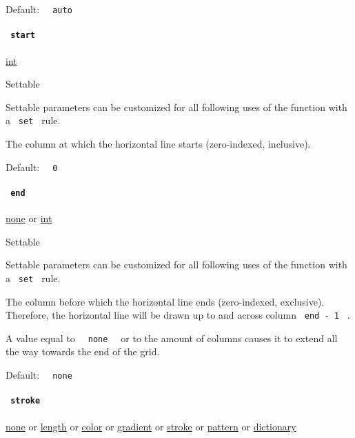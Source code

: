 Default: \texttt{\ }{\texttt{\ auto\ }}\texttt{\ }

\paragraph{\texorpdfstring{\texttt{\ start\ }}{ start }}\label{definitions-hline-start}

\href{/docs/reference/foundations/int/}{int}

{{ Settable }}

\label{definitions-hline-start-settable-tooltip}
Settable parameters can be customized for all following uses of the
function with a \texttt{\ set\ } rule.

The column at which the horizontal line starts (zero-indexed,
inclusive).

Default: \texttt{\ }{\texttt{\ 0\ }}\texttt{\ }

\paragraph{\texorpdfstring{\texttt{\ end\ }}{ end }}\label{definitions-hline-end}

\href{/docs/reference/foundations/none/}{none} {or}
\href{/docs/reference/foundations/int/}{int}

{{ Settable }}

\label{definitions-hline-end-settable-tooltip}
Settable parameters can be customized for all following uses of the
function with a \texttt{\ set\ } rule.

The column before which the horizontal line ends (zero-indexed,
exclusive). Therefore, the horizontal line will be drawn up to and
across column \texttt{\ end\ -\ 1\ } .

A value equal to \texttt{\ }{\texttt{\ none\ }}\texttt{\ } or to the
amount of columns causes it to extend all the way towards the end of the
grid.

Default: \texttt{\ }{\texttt{\ none\ }}\texttt{\ }

\paragraph{\texorpdfstring{\texttt{\ stroke\ }}{ stroke }}\label{definitions-hline-stroke}

\href{/docs/reference/foundations/none/}{none} {or}
\href{/docs/reference/layout/length/}{length} {or}
\href{/docs/reference/visualize/color/}{color} {or}
\href{/docs/reference/visualize/gradient/}{gradient} {or}
\href{/docs/reference/visualize/stroke/}{stroke} {or}
\href{/docs/reference/visualize/pattern/}{pattern} {or}
\href{/docs/reference/foundations/dictionary/}{dictionary}

